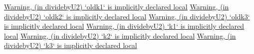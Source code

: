 \documentclass{article}
\begin{document}
\href{http://www.maplesoft.com/support/help/errors/view.aspx?path=Warning,%20(in%20dividebyU2)%20%60oldk1%60%20is%20implicitly%20declared%20local}{Warning, (in dividebyU2) `oldk1` is implicitly declared local}%
\href{http://www.maplesoft.com/support/help/errors/view.aspx?path=Warning,%20(in%20dividebyU2)%20%60oldk2%60%20is%20implicitly%20declared%20local}{Warning, (in dividebyU2) `oldk2` is implicitly declared local}%
\href{http://www.maplesoft.com/support/help/errors/view.aspx?path=Warning,%20(in%20dividebyU2)%20%60oldk3%60%20is%20implicitly%20declared%20local}{Warning, (in dividebyU2) `oldk3` is implicitly declared local}%
\href{http://www.maplesoft.com/support/help/errors/view.aspx?path=Warning,%20(in%20dividebyU2)%20%60k1%60%20is%20implicitly%20declared%20local}{Warning, (in dividebyU2) `k1` is implicitly declared local}%
\href{http://www.maplesoft.com/support/help/errors/view.aspx?path=Warning,%20(in%20dividebyU2)%20%60k2%60%20is%20implicitly%20declared%20local}{Warning, (in dividebyU2) `k2` is implicitly declared local}%
\href{http://www.maplesoft.com/support/help/errors/view.aspx?path=Warning,%20(in%20dividebyU2)%20%60k3%60%20is%20implicitly%20declared%20local}{Warning, (in dividebyU2) `k3` is implicitly declared local}%
\end{document}
